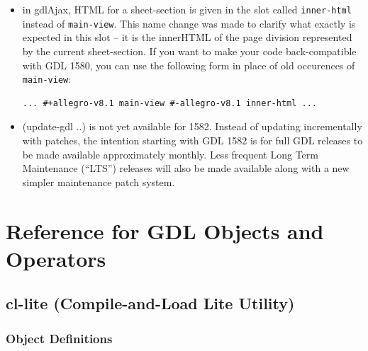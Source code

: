 \documentclass [11pt]{book}
\begin{document}
\begin{itemize}
\item in gdlAjax, HTML for a sheet-section is given in the slot called \texttt{inner-html} instead of \texttt{main-view}. This name change was made to clarify what exactly is
	 expected in this slot -- it is the innerHTML of the page
	 division represented by the current sheet-section. If you
	 want to make your code back-compatible with GDL 1580, you can
	 use the following form in place of old occurences of \texttt{main-view}: 

\begin{verbatim}... #+allegro-v8.1 main-view #-allegro-v8.1 inner-html ...
\end{verbatim}

\item (update-gdl ..) is not yet available for 1582. Instead
of updating incrementally with patches, the intention starting with
GDL 1582 is for full GDL releases to be made available approximately
monthly. Less frequent Long Term Maintenance (``LTS'') releases will
also be made available along with a new simpler maintenance patch
system.

\end{itemize}



\chapter{Reference for GDL Objects and Operators}

\label{chap:referenceforgdlobjectsandoperators}



\section{cl-lite (Compile-and-Load Lite Utility)}

\label{sec:cl-lite(compile-and-loadliteutility)}





\subsection{Object Definitions}

\label{subsec:objectdefinitions}
\end{document}
